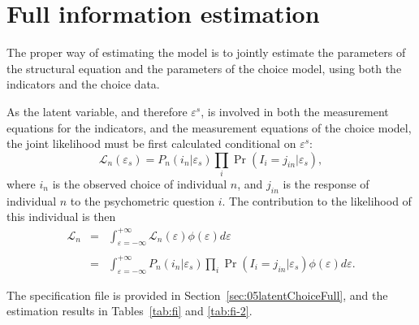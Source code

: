 \documentclass[12pt,a4paper]{article}
\newcommand{\prob}{\operatorname{Pr}}
\begin{document}
\clearpage

\section{Full information estimation}
\label{sec:fi}
The proper way of estimating the model is to jointly estimate the
parameters of the structural equation and the
parameters of the choice model, using both the indicators and the
choice data. 

As the latent variable, and therefore $\varepsilon^s$, is involved in
both the measurement equations for the indicators, and the measurement
equations of the choice model, the joint likelihood must be first
calculated conditional on $\varepsilon^s$:
\begin{equation}
\label{eq:fiLike1}
\mathcal{L}_n(\varepsilon_s) = P_n(i_n|\varepsilon_s) \prod_{i} \prob(I_i = j_{in}|\varepsilon_s),  
\end{equation}
where $i_n$ is the observed choice of individual $n$, and $j_{in}$ is
the response of individual $n$ to the psychometric question  $i$. The
contribution to the likelihood of this individual is then
\begin{equation}
\label{eq:fiLike2}
\begin{array}{rcl}
\mathcal{L}_n &=& \displaystyle\int_{\varepsilon=-\infty}^{+\infty}
\mathcal{L}_n(\varepsilon) \phi(\varepsilon)d\varepsilon \\ && \\
&=& \displaystyle\int_{\varepsilon=-\infty}^{+\infty}P_n(i_n|\varepsilon_s) \prod_{i} \prob(I_i = j_{in}|\varepsilon_s) \phi(\varepsilon)d\varepsilon.
\end{array}
\end{equation}
 
The specification file is provided in
Section~\ref{sec:05latentChoiceFull}, and the estimation results in
Tables~\ref{tab:fi} and \ref{tab:fi-2}.
\end{document}
